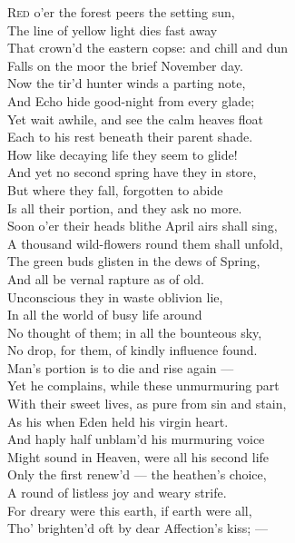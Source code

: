 \textsc{Red} o’er the forest peers the setting sun, \\
 The line of yellow light dies fast away \\
 That crown’d the eastern copse: and chill and dun \\
 Falls on the moor the brief November day. \\
  Now the tir’d hunter winds a parting note, \\
 And Echo hide good-night from every glade; \\
 Yet wait awhile, and see the calm heaves float \\
 Each to his rest beneath their parent shade. \\
  How like decaying life they seem to glide! \\
 And yet no second spring have they in store, \\
 But where they fall, forgotten to abide \\
 Is all their portion, and they ask no more. \\
  Soon o’er their heads blithe April airs shall sing, \\
 A thousand wild-flowers round them shall unfold, \\
 The green buds glisten in the dews of Spring, \\
 And all be vernal rapture as of old. \\
  Unconscious they in waste oblivion lie, \\
 In all the world of busy life around \\
 No thought of them; in all the bounteous sky, \\
 No drop, for them, of kindly influence found. \\
  Man’s portion is to die and rise again — \\
 Yet he complains, while these unmurmuring part \\
 With their sweet lives, as pure from sin and stain, \\
 As his when Eden held his virgin heart. \\
  And haply half unblam’d his murmuring voice \\
 Might sound in Heaven, were all his second life \\
 Only the first renew’d — the heathen’s choice, \\
 A round of listless joy and weary strife. \\
  For dreary were this earth, if earth were all, \\
 Tho’ brighten’d oft by dear Affection’s kiss; — \\
